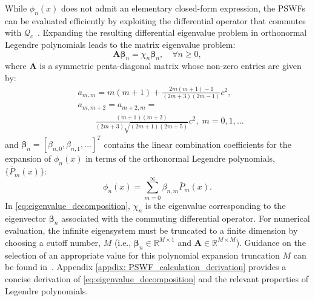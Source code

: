 \documentclass[lettersize,journal]{IEEEtran}
\theoremstyle{plain}
\begin{document}
While $\phi_n(x)$ does not admit an elementary closed-form expression, the PSWFs can be evaluated efficiently by exploiting the differential operator that commutes with $\mathcal{Q}_c$~\cite{Slepian1961Prolate}. Expanding the resulting differential eigenvalue problem in orthonormal Legendre polynomials leads to the matrix eigenvalue problem:
\begin{equation}
	\mathbf{A}\boldsymbol{\beta}_n = \chi_n\boldsymbol{\beta}_n, \quad \forall n \geq 0,
	\label{eq:eigenvalue_decomposition}
\end{equation}
where 
$\mathbf{A}$ is a symmetric penta-diagonal matrix whose non-zero entries are given by:
\begin{align}
	&a_{m, m} = m(m+1) + \frac{2m(m+1) - 1}{(2m+3)(2m - 1)}c^2, \nonumber \\
	&a_{m, m+2} = a_{m+2, m} = \nonumber \\ &\quad\quad\frac{(m+1)(m+2)}{(2m+3)\sqrt{(2m+1)(2m+5)}} c^2,  \; m = 0,1,\ldots \nonumber
	\label{eq:A_entries}
\end{align}
and $\boldsymbol{\beta}_n = [\beta_{n, 0}, \beta_{n, 1}, ...]^T$ contains the linear combination coefficients for the expansion of $\phi_n(x)$ in terms of the orthonormal Legendre polynomials, $\{\bar{P}_m(x)\}$:
\begin{equation}
	\phi_n(x) = \sum_{m=0}^{\infty}\beta_{n, m}\bar{P}_m(x).
	\label{eq:Legendre_linear_combination}
\end{equation}
In \eqref{eq:eigenvalue_decomposition}, $\chi_n$ is the eigenvalue corresponding to the eigenvector $\boldsymbol{\beta}_n$ associated with the commuting differential operator. For numerical evaluation, the infinite eigensystem must be truncated to a finite dimension by choosing a cutoff number, $M$ (i.e., $\boldsymbol{\beta}_n \in \mathbb{R}^{M \times 1}$ and $\mathbf{A} \in \mathbb{R}^{M \times M}$). Guidance on the selection of an appropriate value for  this polynomial expansion truncation $M$ can be found in~\cite{BOYD2003Large, schmutzhard2015numerical}.
Appendix \ref{appdix: PSWF_calculation_derivation} provides a concise derivation of \eqref{eq:eigenvalue_decomposition} and the relevant properties of Legendre polynomials.
	
\end{document}
